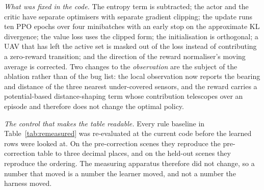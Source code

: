 \emph{What was fixed in the code.}  The entropy term is subtracted; the actor
and the critic have separate optimisers with separate gradient clipping; the
update runs ten PPO epochs over four minibatches with an early stop on the
approximate KL divergence; the value loss uses the clipped form; the
initialisation is orthogonal; a UAV that has left the active set is masked out
of the loss instead of contributing a zero-reward transition; and the
direction of the reward normaliser's moving average is corrected.  Two changes
to the \emph{observation} are the subject of the ablation rather than of the
bug list: the local observation now reports the bearing and distance of the
three nearest under-covered sensors, and the reward carries a potential-based
distance-shaping term whose contribution telescopes over an episode and
therefore does not change the optimal policy.

\emph{The control that makes the table readable.}  Every rule baseline in
Table~\ref{tab:remeasured} was re-evaluated at the current code before the
learned rows were looked at.  On the pre-correction scenes they reproduce the
pre-correction table to three decimal places, and on the held-out scenes they
reproduce the ordering.  The measuring apparatus therefore did not change, so
a number that moved is a number the learner moved, and not a number the
harness moved.

